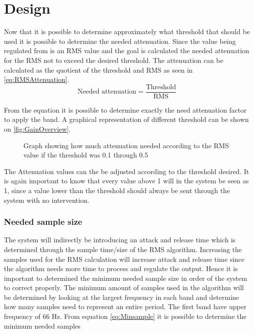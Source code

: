\section{Design}
Now that it is possible to determine approximately what threshold that should be used it is possible to determine the needed attenuation. Since the value being regulated from is an RMS value and the goal is calculated the needed attenuation for the RMS not to exceed the desired threshold. The attenuation can be calculated as the quotient of the threshold and RMS as seen in \autoref{eq:RMSAttenuation}.
\begin{equation}\label{eq:RMSAttenuation}
\text{Needed attenuation} = \frac{\text{Threshold}}{\text{RMS}}
\end{equation}

From the equation it is possible to determine exactly the need attenuation factor to apply the band. A graphical representation of different threshold can be shown on \autoref{fig:GainOverview}.

\begin{figure}[H]
\centering
{}

\caption{Graph showing how much attenuation needed according to the RMS value if the threshold was 0.1 through 0.5}
\label{fig:GainOverview}
\end{figure}

The Attenuation values can the be adjusted according to the threshold desired. It is again important to know that every value above 1 will in the system be seen as 1, since a value lower than the threshold should always be sent through the system with no intervention.  


\subsubsection{Needed sample size}
The system will indirectly be introducing an attack and release time which is determined through the sample time/size of the RMS algorithm. Increasing the samples used for the RMS calculation will increase attack and release time since the algorithm needs more time to process and regulate the output. Hence it is important to determined the minimum needed sample size in order of the system to correct properly. The minimum amount of samples used in the algorithm will be determined by looking at the largest frequency in each band and determine how many samples need to represent an entire period. The first band have upper frequency of 66 Hz. From equation \ref{eq:Minsample} it is possible to determine the minimum needed samples

